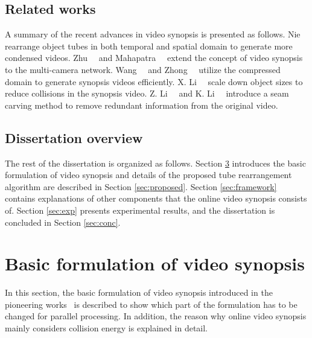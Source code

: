 \documentclass[11pt]{hyu_thesis}
\begin{document}
\section{Related works}
\label{sec:intro:related}
A summary of the recent advances in video synopsis is presented as follows. Nie~\etal~\cite{Nie2014} rearrange object tubes in both temporal and spatial domain to generate more condensed videos. Zhu~\etal~\cite{Zhu2014} and Mahapatra~\etal~\cite{Mahapatra2016} extend the concept of video synopsis to the multi-camera network. Wang~\etal~\cite{Wang2013} and Zhong~\etal~\cite{RuiZhong2014} utilize the compressed domain to generate synopsis videos efficiently. X. Li~\etal~\cite{Li2016a} scale down object sizes to reduce collisions in the synopsis video. Z. Li~\etal~\cite{ZhuangLi2009} and K. Li~\etal~\cite{Li2016} introduce a seam carving method to remove redundant information from the original video.

\section{Dissertation overview}
\label{sec:intro:overview}
The rest of the dissertation is organized as follows. Section \ref{sec:basic_form} introduces the basic formulation of video synopsis and details of the proposed tube rearrangement algorithm are described in Section \ref{sec:proposed}. Section \ref{sec:framework} contains explanations of other components that the online video synopsis consists of. Section \ref{sec:exp} presents experimental results, and the dissertation is concluded in Section \ref{sec:conc}.

\chapter{Basic formulation of video synopsis}
\label{sec:basic_form}

In this section, the basic formulation of video synopsis introduced in the pioneering works~\cite{Rav-Acha2006,Pritch2007,Pritch2008} is described to show which part of the formulation has to be changed for parallel processing. In addition, the reason why online video synopsis mainly considers collision energy is explained in detail.
\end{document}
